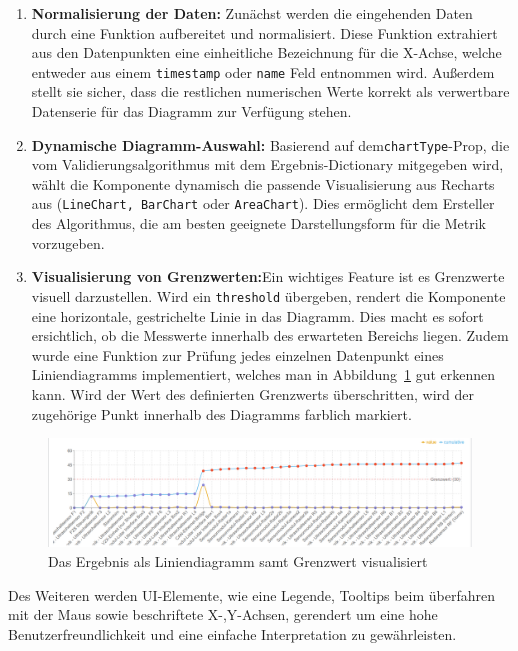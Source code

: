 \begin{enumerate}
  \item \textbf{Normalisierung der Daten:} Zunächst werden die eingehenden Daten durch eine Funktion aufbereitet und normalisiert. Diese Funktion extrahiert aus den Datenpunkten eine einheitliche Bezeichnung für die X-Achse, welche entweder aus einem \texttt{timestamp} oder \texttt{name} Feld entnommen wird. Außerdem stellt sie sicher, dass die restlichen numerischen Werte korrekt als verwertbare Datenserie für das Diagramm zur Verfügung stehen.
  \item \textbf{Dynamische Diagramm-Auswahl:} Basierend auf dem\texttt{chartType}-Prop, die vom Validierungsalgorithmus mit dem Ergebnis-Dictionary mitgegeben wird, wählt die Komponente dynamisch die passende Visualisierung aus Recharts aus (\texttt{LineChart, BarChart} oder \texttt{AreaChart}). Dies ermöglicht dem Ersteller des Algorithmus, die am besten geeignete Darstellungsform für die Metrik vorzugeben.
  \item \textbf{Visualisierung von Grenzwerten:}Ein wichtiges Feature ist es Grenzwerte visuell darzustellen. Wird ein \texttt{threshold} übergeben, rendert die Komponente eine horizontale, gestrichelte Linie in das Diagramm. Dies macht es sofort ersichtlich, ob die Messwerte innerhalb des erwarteten Bereichs liegen. Zudem wurde eine Funktion zur Prüfung jedes einzelnen Datenpunkt eines Liniendiagramms implementiert, welches man in Abbildung~\ref{fig:Liniendiagramm} gut erkennen kann. Wird der Wert des definierten Grenzwerts überschritten, wird der zugehörige Punkt innerhalb des Diagramms farblich markiert.
\end{enumerate}

\begin{figure}[h!]
  \centering
  \includegraphics[width=\textwidth]{figures/06Evaluation/Line.png}
  \caption{Das Ergebnis als Liniendiagramm samt Grenzwert visualisiert}
  \label{fig:Liniendiagramm}
\end{figure}

Des Weiteren werden UI-Elemente, wie eine Legende, Tooltips beim überfahren mit der Maus sowie beschriftete X-,Y-Achsen, gerendert um eine hohe Benutzerfreundlichkeit und eine einfache Interpretation zu gewährleisten.

